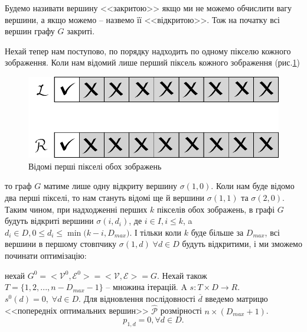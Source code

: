 \documentclass{ConfFTI}
\begin{document}
\label {2.1-style} Будемо називати вершину <<закритою>> якщо ми не можемо обчислити вагу вершини, а якщо можемо -- назвемо її <<відкритою>>. 
Тож на початку всі вершин графу $G$ закриті.

Нехай тепер нам поступово, по порядку надходить по одному пікселю кожного зображення. Коли нам відомий лише перший піксель кожного зображення (рис.\ref{2.2onedata})
\begin{figure}[h]
	\centering
	\includegraphics[scale = 0.5]{onestereoknown.pdf}
	\caption{Відомі перші пікселі обох зображень}
	\label{2.2onedata}
\end{figure}
то граф $G$ матиме лише одну відкриту вершину $\sigma(1, 0)$. Коли нам буде відомо два перші пікселі, то нам стануть відомі ще й вершини 
$\sigma(1, 1)$ та $\sigma(2, 0)$. Таким чином, при надходженні перших $k$ пікселів обох зображень, в графі $G$ будуть відкриті вершини 
$\sigma(i, d_i)$, де $i \in I, i \leq k$, a $d_i \in D, 0 \leq d_i \leq \min{\big( k - i, D_{max}  \big)}$. І тільки коли $k$ буде більше за $D_{max}$, всі вершини в першому стовпчику $\sigma(1, d) \; \forall d \in D $ будуть відкритими, і ми зможемо починати оптимізацію:

нехай $G^0 = <\mathcal{V}^0, \mathcal{E}^0> = <\mathcal{V}, \mathcal{E}> = G $. Нехай також $ T = \{1, 2, ..., n - D_{max} - 1\} $ -- множина ітерацій. A
$ s: T \times D \rightarrow R $. $s^0(d) = 0, \; \forall d \in D $. Для відновлення послідовності 
$\overline{d}$ введемо матрицю <<попередніх оптимальних вершин>> $\hat{\mathcal{P}}$ розмірності $n \times (D_{max} + 1)$.  $$p_{1,d} = 0, \forall d \in D. $$
\end{document}
